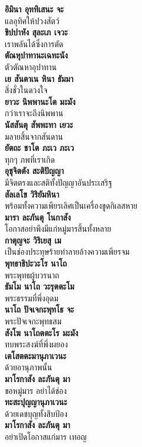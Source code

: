 \documentclass[12pt]{article}
\begin{document}
\textbf{อิมินา อุททิเสนะ จะ}\\
\indent แลอุทิศให้ปวงสัตว์\\
\textbf{ขิปปาหัง สุละเภ เจวะ}\\
\indent เราพลันได้ซึ่งการตัด\\
\textbf{ตัณหุปาทานะเฉทะนัง}\\
\indent ตัวตัณหาอุปาทาน\\
\textbf{เย สันตาเน หินา ธัมมา}\\
\indent สิ่งชั่วในดวงใจ\\
\textbf{ยาวะ นิพพานะโต มะมัง}\\
\indent กว่าเราจะถึงนิพพาน\\
\textbf{นัสสันตุ สัพพะทา เยวะ}\\
\indent มลายสิ้นจากสันดาน\\
\textbf{ยัตถะ ชาโต ภะเว ภะเว}\\
\indent ทุกๆ ภพที่เราเกิด\\
\textbf{อุชุจิตตัง สะติปัญญา}\\
\indent มีจิตตรงและสติทั้งปัญญาอันประเสริฐ\\
\textbf{สัลเลโข วิริยัมหินา}\\
\indent พร้อมทั้งความเพียรเลิศเป็นเครื่องขูดกิเลสหาย\\
\textbf{มารา ละภันตุ โนกาสัง}\\
\indent โอกาสอย่าพึงมีแก่หมู่มารสิ้นทั้งหลาย\\
\textbf{กาตุญจะ วิริเยสุ เม}\\
\indent เป็นช่องประทุษร้ายทำลายล้างความเพียรจม\\
\textbf{พุทธาธิปะวะโร นาโถ}\\
\indent พระพุทธผู้บวรนาถ\\
\textbf{ธัมโม นาโถ วะรุตตะโม}\\
\indent พระธรรมที่พึ่งอุดม\\
\textbf{นาโถ ปัจเจกะพุทโธ จะ}\\
\indent พระปัจเจกะพุทธสม\\
\textbf{สังโฆ นาโถตตะโร มะมัง}\\
\indent ทบพระสงฆ์ที่พึ่งผยอง\\
\textbf{เตโสตตะมานุภาเวนะ}\\
\indent ด้วยอานุภาพนั้น\\
\textbf{มาโรกาสัง ละภันตุ มา}\\
\indent ขอหมู่มาร อย่าได้ช่อง\\
\textbf{ทะสะปุญญานุภาเวนะ}\\
\indent ด้วยเดชบุญทั้งสิบป้อง\\
\textbf{มาโรกาสัง ละภันตุ มา}\\
\indent อย่าเปิดโอกาสแก่มาร เทอญ\\
\end{document}
